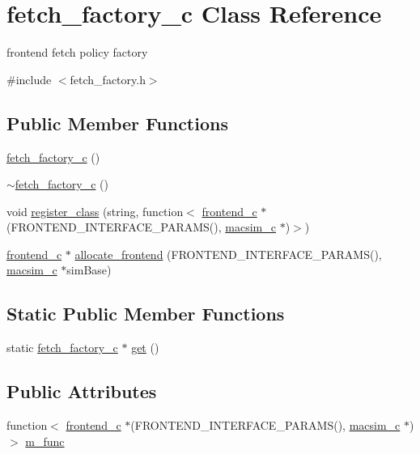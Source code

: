\hypertarget{classfetch__factory__c}{
\section{fetch\_\-factory\_\-c Class Reference}
\label{classfetch__factory__c}
}


frontend fetch policy factory  




{\ttfamily \#include $<$fetch\_\-factory.h$>$}

\subsection*{Public Member Functions}
\begin{DoxyCompactItemize}
\item 
\hyperlink{classfetch__factory__c_ac150d37c435e7a7c1f14a04ad6d25821}{fetch\_\-factory\_\-c} ()
\item 
\hyperlink{classfetch__factory__c_a89dd7bdbacca244d989e5aadfdcdd658}{$\sim$fetch\_\-factory\_\-c} ()
\item 
void \hyperlink{classfetch__factory__c_a0de8e5f3cd8630203a7283181aa085a0}{register\_\-class} (string, function$<$ \hyperlink{classfrontend__c}{frontend\_\-c} $\ast$(FRONTEND\_\-INTERFACE\_\-PARAMS(), \hyperlink{classmacsim__c}{macsim\_\-c} $\ast$)$>$)
\item 
\hyperlink{classfrontend__c}{frontend\_\-c} $\ast$ \hyperlink{classfetch__factory__c_a9cf553a9b5ba8e7dc6f21a76e03f47a9}{allocate\_\-frontend} (FRONTEND\_\-INTERFACE\_\-PARAMS(), \hyperlink{classmacsim__c}{macsim\_\-c} $\ast$simBase)
\end{DoxyCompactItemize}
\subsection*{Static Public Member Functions}
\begin{DoxyCompactItemize}
\item 
static \hyperlink{classfetch__factory__c}{fetch\_\-factory\_\-c} $\ast$ \hyperlink{classfetch__factory__c_a9325d0d045b20c50da90884a83df440b}{get} ()
\end{DoxyCompactItemize}
\subsection*{Public Attributes}
\begin{DoxyCompactItemize}
\item 
function$<$ \hyperlink{classfrontend__c}{frontend\_\-c} $\ast$(FRONTEND\_\-INTERFACE\_\-PARAMS(), \hyperlink{classmacsim__c}{macsim\_\-c} $\ast$)$>$ \hyperlink{classfetch__factory__c_a737090cb3269200990000a3996308979}{m\_\-func}
\end{DoxyCompactItemize}
